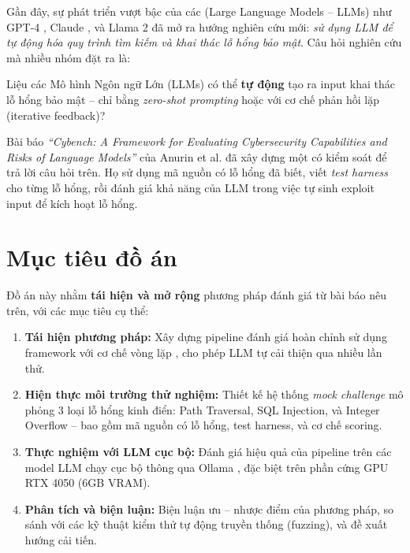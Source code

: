 \documentclass{nt521report}
\begin{document}
Gần đây, sự phát triển vượt bậc của các  (Large Language Models -- LLMs) như GPT-4 \cite{openai2023gpt4}, Claude \cite{anthropic2024claude}, và Llama 2 \cite{touvron2023llama2} đã mở ra hướng nghiên cứu mới: \textit{sử dụng LLM để tự động hóa quy trình tìm kiếm và khai thác lỗ hổng bảo mật}. Câu hỏi nghiên cứu mà nhiều nhóm đặt ra là:

\begin{notebox}[title={Câu hỏi nghiên cứu}]
  Liệu các Mô hình Ngôn ngữ Lớn (LLMs) có thể \textbf{tự động} tạo ra input khai thác lỗ hổng bảo mật -- chỉ bằng \textit{zero-shot prompting} hoặc với cơ chế phản hồi lặp (iterative feedback)?
\end{notebox}

Bài báo \emph{``Cybench: A Framework for Evaluating Cybersecurity Capabilities and Risks of Language Models''} \cite{honestcybereval2024} của Anurin et al. đã xây dựng một  có kiểm soát để trả lời câu hỏi trên. Họ sử dụng mã nguồn có lỗ hổng đã biết, viết \textit{test harness} cho từng lỗ hổng, rồi đánh giá khả năng của LLM trong việc tự sinh exploit input để kích hoạt lỗ hổng.

\section{Mục tiêu đồ án}
\label{sec:objectives}

Đồ án này nhằm \textbf{tái hiện và mở rộng} phương pháp đánh giá từ bài báo nêu trên, với các mục tiêu cụ thể:

\begin{enumerate}
  \item \textbf{Tái hiện phương pháp:} Xây dựng pipeline đánh giá hoàn chỉnh sử dụng framework  với cơ chế vòng lặp  \cite{shinn2023reflexion}, cho phép LLM tự cải thiện qua nhiều lần thử.

  \item \textbf{Hiện thực môi trường thử nghiệm:} Thiết kế hệ thống \textit{mock challenge} mô phỏng 3 loại lỗ hổng kinh điển: Path Traversal, SQL Injection, và Integer Overflow -- bao gồm mã nguồn có lỗ hổng, test harness, và cơ chế scoring.

  \item \textbf{Thực nghiệm với LLM cục bộ:} Đánh giá hiệu quả của pipeline trên các model LLM chạy cục bộ thông qua Ollama \cite{ollama2024}, đặc biệt trên phần cứng GPU RTX 4050 (6GB VRAM).

  \item \textbf{Phân tích và biện luận:} Biện luận ưu -- nhược điểm của phương pháp, so sánh với các kỹ thuật kiểm thử tự động truyền thống (fuzzing), và đề xuất hướng cải tiến.
\end{enumerate}
\end{document}
